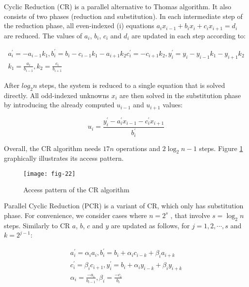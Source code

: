 Cyclic Reduction (CR) is a parallel alternative to Thomas algorithm.
It also consists of two phases (reduction and substitution). In each intermediate step
of the reduction phase, all even-indexed (i) equations 
$a_{i} x_{i-1}+b_{i} x_{i}+c_{i} x_{i+1}=d_{i}$ are
reduced. The values of $a_i$, $b_i$, $c_i$ and $d_i$ are updated in 
each step according to:

\begin{equation}
    \begin{array}{c}
        a_{i}^{\prime}=-a_{i-1} k_{1}, b_{i}^{\prime}=b_{i}-c_{i-1} k_{1}-a_{i+1} k_{2} c_{i}^{\prime}=-c_{i+1} k_{2}, y_{i}^{\prime}=y_{i}-y_{i-1} k_{1}-y_{i+1} k_{2} \\
        k_{1}=\frac{a_{i}}{b_{i-1}}, k_{2}=\frac{c_{i}}{b_{i+1}}
    \end{array}
\end{equation}

After $log_2 n$ steps, the system is reduced to a single equation that is
 solved directly. All odd-indexed unknowns $x_i$ are then solved in the 
 substitution phase by introducing the already computed $u_{i−1}$ and 
 $u_{i+1}$ values:

\begin{equation}
    u_{i}=\frac{y_{i}^{\prime}-a_{i}^{\prime} x_{i-1}-c_{i}^{\prime} x_{i+1}}{b_{i}^{\prime}}
\end{equation}

Overall, the CR algorithm needs $17n$ operations and $2 \log_2 n - 1$ 
steps. Figure \ref{fig:22} graphically illustrates its access pattern.

\vspace{5ex}
\begin{figure}[htbp]
    \centering
    \texttt{[image: fig-22]}
    \label{fig:22}
    \caption{Access pattern of the CR algorithm}
\end{figure}

Parallel Cyclic Reduction (PCR) is a variant of CR, which only has
substitution phase. For convenience, we consider cases where $n = 2^s$
, that involve $s = \log_2 n$ steps. Similarly to CR $a$, $b$, $c$ and $y$ 
are updated as follows, for $j = 1, 2, \cdots, s$ and $k = 2^{j-1}$:

\begin{equation}
    \begin{array}{c}
        a_{i}^{\prime}=\alpha_{i} a_{i}, b_{i}^{\prime}=b_{i}+\alpha_{i} c_{i-k}+\beta_{i} a_{i+k} \\
        c_{i}^{\prime}=\beta_{i} c_{i+1}, y_{i}^{\prime}=b_{i}+\alpha_{i} y_{i-k}+\beta_{i} y_{i+k} \\
        \alpha_{i}=\frac{-a_{i}}{b_{i-1}}, \beta_{i}=\frac{-c_{i}}{b_{i}}
    \end{array}
\end{equation}

